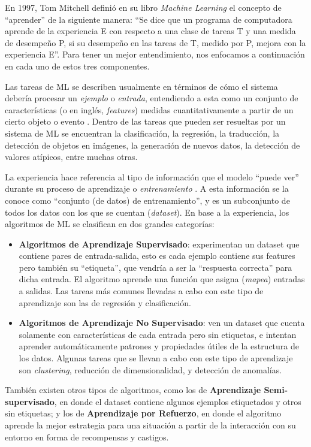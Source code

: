 \documentclass[../../main.tex]{subfiles}
\begin{document}
En 1997, Tom Mitchell definió en su libro \textit{Machine Learning} \cite{ml-tom-mitchell} el concepto de ``aprender'' de la siguiente manera: ``Se dice que un programa de computadora aprende de la experiencia E con respecto a una clase de tareas T y una medida de desempeño P, si su desempeño en las tareas de T, medido por P, mejora con la experiencia E''. Para tener un mejor entendimiento, nos enfocamos a continuación en cada uno de estos tres componentes.

Las tareas de ML se describen usualmente en términos de cómo el sistema debería procesar un \textit{ejemplo} o \textit{entrada}, entendiendo a esta como un conjunto de características (o en inglés, \textit{features}) medidas cuantitativamente a partir de un cierto objeto o evento \cite{deep-learning}. Dentro de las tareas que pueden ser resueltas por un sistema de ML se encuentran la clasificación, la regresión, la traducción, la detección de objetos en imágenes, la generación de nuevos datos, la detección de valores atípicos, entre muchas otras.

La experiencia hace referencia al tipo de información que el modelo ``puede ver'' durante su proceso de aprendizaje o \textit{entrenamiento} \cite{hands-on-ML-sklearn-tf}. A esta información se la conoce como ``conjunto (de datos) de entrenamiento'', y es un subconjunto de todos los datos con los que se cuentan (\textit{dataset}). En base a la experiencia, los algoritmos de ML se clasifican en dos grandes categorías:
\begin{itemize}
    \item \textbf{Algoritmos de Aprendizaje Supervisado}: experimentan un dataset que contiene pares de entrada-salida, esto es cada ejemplo contiene sus features pero también su ``etiqueta'', que vendría a ser la ``respuesta correcta'' para dicha entrada. El algoritmo aprende una función que asigna (\textit{mapea}) entradas a salidas. Las tareas más comunes llevadas a cabo con este tipo de aprendizaje son las de regresión y clasificación.
    \item \textbf{Algoritmos de Aprendizaje No Supervisado}: ven un dataset que cuenta solamente con características de cada entrada pero sin etiquetas, e intentan aprender automáticamente patrones y propiedades útiles de la estructura de los datos. Algunas tareas que se llevan a cabo con este tipo de aprendizaje son \textit{clustering}, reducción de dimensionalidad, y detección de anomalías.
\end{itemize}
También existen otros tipos de algoritmos, como los de \textbf{Aprendizaje Semi-supervisado}, en donde el dataset contiene algunos ejemplos etiquetados y otros sin etiquetas; y los de \textbf{Aprendizaje por Refuerzo}, en donde el algoritmo aprende la mejor estrategia para una situación a partir de la interacción con su entorno en forma de recompensas y castigos.
\end{document}

